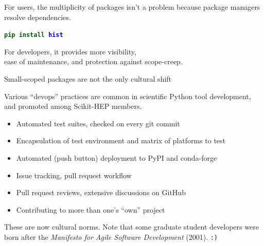 \documentclass[aspectratio=169]{beamer}
\begin{document}
\begin{frame}{}
\vspace{1 cm}
\Large

\begin{center}
For users, the multiplicity of packages isn't a problem because package managers resolve dependencies.

\vspace{1 cm}
\texttt{\textbf{\textcolor{darkgreen}{pip install} \textcolor{blue}{hist}}}

\vspace{1 cm}
For developers, it provides more visibility, \\ ease of maintenance, and protection against scope-creep.
\end{center}
\end{frame}

\begin{frame}{Small-scoped packages are not the only cultural shift}
\vspace{0.5 cm}
\large

Various ``devops'' practices are common in scientific Python tool development, and promoted among Scikit-HEP members.

\vspace{0.25 cm}
\begin{itemize}
\item Automated test suites, checked on every git commit
\item Encapsulation of test environment and matrix of platforms to test
\item Automated (push button) deployment to PyPI and conda-forge
\item Issue tracking, pull request workflow
\item Pull request reviews, extensive discussions on GitHub
\item Contributing to more than one's ``own'' project
\end{itemize}

\vspace{0.5 cm}
These are now cultural norms. Note that some graduate student developers were born after the {\it Manifesto for Agile Software Development} (2001). {\tt :)}
\end{frame}
\end{document}
